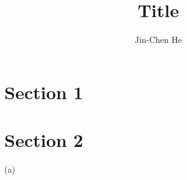 \documentclass[prd,aps,nofootinbib,floatfix,10pt]{revtex4}
\newcommand{\red}{\textcolor{red}}
\begin{document}
\title{Title}
\author{Jin-Chen He}
\maketitle

\section{Section 1}

\red{}

\section{Section 2}

\noindent (a)


\begin{thebibliography}{1}
	
\end{thebibliography}
\end{document}
